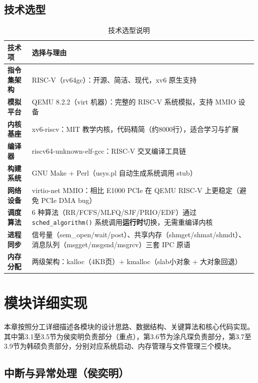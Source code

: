 \documentclass[12pt,a4paper]{ctexart}
\begin{document}
\subsection{技术选型}

\begin{table}[H]
\centering
\caption{技术选型说明}
\begin{tabular}{>{\bfseries}p{3.5cm}p{9.5cm}}
\toprule
\textbf{技术项} & \textbf{选择与理由} \\
\midrule
指令集架构   & RISC-V（rv64gc）：开源、简洁、现代，xv6 原生支持 \\
模拟平台     & QEMU 8.2.2（virt 机器）：完整的 RISC-V 系统模拟，支持 MMIO 设备 \\
内核基座     & xv6-riscv：MIT 教学内核，代码精简（约8000行），适合学习与扩展 \\
编译器       & riscv64-unknown-elf-gcc：RISC-V 交叉编译工具链 \\
构建系统     & GNU Make + Perl（usys.pl 自动生成系统调用 stub） \\
网络设备     & virtio-net MMIO：相比 E1000 PCIe 在 QEMU RISC-V 上更稳定（避免 PCIe DMA bug） \\
调度算法     & 6 种算法（RR/FCFS/MLFQ/SJF/PRIO/EDF）通过 \texttt{sched\_algorithm()} 系统调用\textbf{运行时}切换，无需重编译内核 \\
进程同步     & 信号量（sem\_open/wait/post）、共享内存（shmget/shmat/shmdt）、消息队列（msgget/msgsnd/msgrcv）三套 IPC 原语 \\
内存分配     & 两级架构：kalloc（4KB页）+ kmalloc（slab小对象 + 大对象回退） \\
\bottomrule
\end{tabular}
\end{table}

\newpage

\section{模块详细实现}

本章按照分工详细描述各模块的设计思路、数据结构、关键算法和核心代码实现。
其中第3.1至3.5节为侯奕明负责部分（重点），第3.6节为涂凡琛负责部分，第3.7至3.9节为韩硕负责部分，分别对应系统启动、内存管理与文件管理三个模块。

\subsection{中断与异常处理（侯奕明）}
\end{document}
